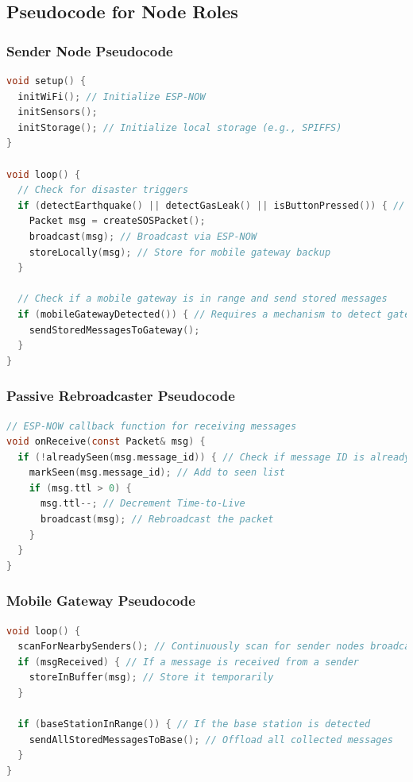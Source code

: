 \documentclass[12pt, a4paper]{article}
\begin{document}
\subsection{Pseudocode for Node Roles}
\subsubsection{Sender Node Pseudocode}
\begin{lstlisting}[language=C]
void setup() {
  initWiFi(); // Initialize ESP-NOW
  initSensors();
  initStorage(); // Initialize local storage (e.g., SPIFFS)
}

void loop() {
  // Check for disaster triggers
  if (detectEarthquake() || detectGasLeak() || isButtonPressed()) { // isButtonPressed includes debounce
    Packet msg = createSOSPacket();
    broadcast(msg); // Broadcast via ESP-NOW
    storeLocally(msg); // Store for mobile gateway backup
  }

  // Check if a mobile gateway is in range and send stored messages
  if (mobileGatewayDetected()) { // Requires a mechanism to detect gateway, e.g., scanning or beacon
    sendStoredMessagesToGateway();
  }
}
\end{lstlisting}

\subsubsection{Passive Rebroadcaster Pseudocode}
\begin{lstlisting}[language=C]
// ESP-NOW callback function for receiving messages
void onReceive(const Packet& msg) {
  if (!alreadySeen(msg.message_id)) { // Check if message ID is already in cache
    markSeen(msg.message_id); // Add to seen list
    if (msg.ttl > 0) {
      msg.ttl--; // Decrement Time-to-Live
      broadcast(msg); // Rebroadcast the packet
    }
  }
}
\end{lstlisting}

\subsubsection{Mobile Gateway Pseudocode}
\begin{lstlisting}[language=C]
void loop() {
  scanForNearbySenders(); // Continuously scan for sender nodes broadcasting messages
  if (msgReceived) { // If a message is received from a sender
    storeInBuffer(msg); // Store it temporarily
  }

  if (baseStationInRange()) { // If the base station is detected
    sendAllStoredMessagesToBase(); // Offload all collected messages
  }
}
\end{lstlisting}
\end{document}
